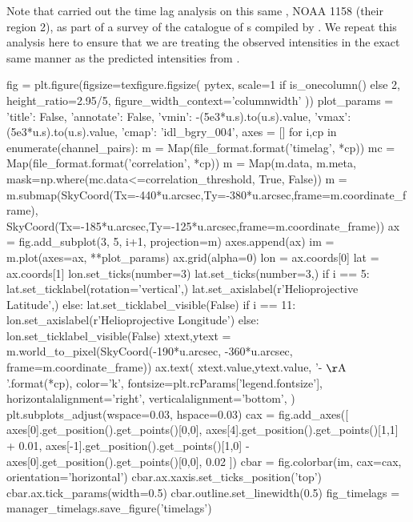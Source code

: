 Note that \citet{viall_survey_2017} carried out the time lag analysis on this same \AR{}, NOAA 1158 (their region 2), as part of a survey of the catalogue of \AR{}s compiled by \citet{warren_systematic_2012}. We repeat this analysis here to ensure that we are treating the observed intensities in the exact same manner as the predicted intensities from .

\begin{pycode}
fig = plt.figure(figsize=texfigure.figsize(
    pytex,
    scale=1 if is_onecolumn() else 2,
    height_ratio=2.95/5,
    figure_width_context='columnwidth'
))
plot_params = {
    'title': False, 
    'annotate': False,
    'vmin': -(5e3*u.s).to(u.s).value,
    'vmax': (5e3*u.s).to(u.s).value,
    'cmap': 'idl_bgry_004',
}
axes = []
for i,cp in enumerate(channel_pairs):
    m = Map(file_format.format('timelag', *cp))
    mc = Map(file_format.format('correlation', *cp))
    m = Map(m.data, m.meta, mask=np.where(mc.data<=correlation_threshold, True, False))
    m = m.submap(SkyCoord(Tx=-440*u.arcsec,Ty=-380*u.arcsec,frame=m.coordinate_frame),
                 SkyCoord(Tx=-185*u.arcsec,Ty=-125*u.arcsec,frame=m.coordinate_frame))
    ax = fig.add_subplot(3, 5, i+1, projection=m)
    axes.append(ax)
    im = m.plot(axes=ax, **plot_params)
    ax.grid(alpha=0)
    lon = ax.coords[0]
    lat = ax.coords[1]
    lon.set_ticks(number=3)
    lat.set_ticks(number=3,) 
    if i == 5:
        lat.set_ticklabel(rotation='vertical',)
        lat.set_axislabel(r'Helioprojective Latitude',)
    else:
        lat.set_ticklabel_visible(False)
    if i == 11:
        lon.set_axislabel(r'Helioprojective Longitude')
    else:
        lon.set_ticklabel_visible(False)
    xtext,ytext = m.world_to_pixel(SkyCoord(-190*u.arcsec, -360*u.arcsec, frame=m.coordinate_frame))
    ax.text(
        xtext.value,ytext.value,
        '{}-{} $\mathrm{{\AA}}$'.format(*cp),
        color='k',
        fontsize=plt.rcParams['legend.fontsize'],
        horizontalalignment='right',
        verticalalignment='bottom',
    )
plt.subplots_adjust(wspace=0.03, hspace=0.03)
cax = fig.add_axes([
    axes[0].get_position().get_points()[0,0],
    axes[4].get_position().get_points()[1,1] + 0.01,
    axes[-1].get_position().get_points()[1,0] - axes[0].get_position().get_points()[0,0], 
    0.02
])
cbar = fig.colorbar(im, cax=cax, orientation='horizontal')
cbar.ax.xaxis.set_ticks_position('top')
cbar.ax.tick_params(width=0.5)
cbar.outline.set_linewidth(0.5)
fig_timelags = manager_timelags.save_figure('timelags')

\end{pycode}
